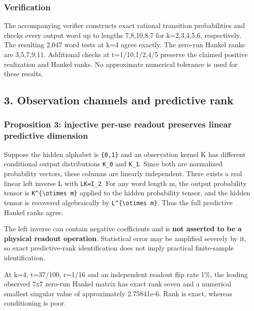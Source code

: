 \documentclass[
  10pt,
  a4paper,
]{article}
\begin{document}
\subsubsection{Verification}\label{verification}

The accompanying verifier constructs exact rational transition probabilities and checks every output word up to lengths 7,8,10,8,7 for k=2,3,4,5,6, respectively. The resulting 2,047 word tests at k=4 agree exactly. The zero-run Hankel ranks are 3,5,7,9,11. Additional checks at t=1/10,1/2,4/5 preserve the claimed positive realization and Hankel ranks. No approximate numerical tolerance is used for these results.

\subsection{3. Observation channels and predictive rank}\label{observation-channels-and-predictive-rank}

\subsubsection{Proposition 3: injective per-use readout preserves linear predictive dimension}\label{proposition-3-injective-per-use-readout-preserves-linear-predictive-dimension}

Suppose the hidden alphabet is \texttt{\{0,1\}} and an observation kernel K has different conditional output distributions \texttt{K\_0} and \texttt{K\_1}. Since both are normalized probability vectors, these columns are linearly independent. There exists a real linear left inverse L with \texttt{LK=I\_2}. For any word length m, the output probability tensor is \texttt{K\^{}\{\textbackslash{}otimes\ m\}} applied to the hidden probability tensor, and the hidden tensor is recovered algebraically by \texttt{L\^{}\{\textbackslash{}otimes\ m\}}. Thus the full predictive Hankel ranks agree.

The left inverse can contain negative coefficients and is \textbf{not asserted to be a physical readout operation}. Statistical error may be amplified severely by it, so exact predictive-rank identification does not imply practical finite-sample identification.

At k=4, t=37/100, r=1/16 and an independent readout flip rate 1\%, the leading observed 7x7 zero-run Hankel matrix has exact rank seven and a numerical smallest singular value of approximately 2.75841e-6. Rank is exact, whereas conditioning is poor.
\end{document}
